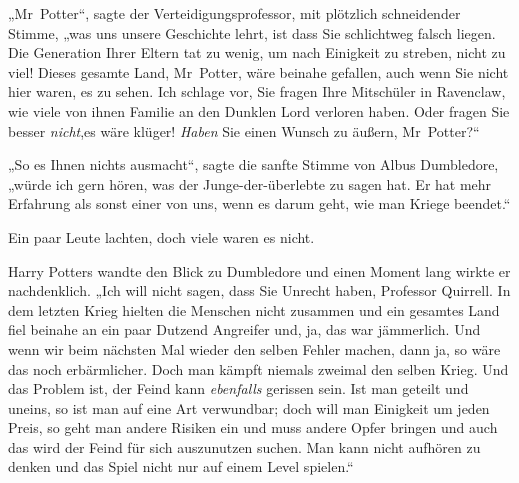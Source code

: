 „Mr~Potter“, sagte der Verteidigungsprofessor, mit plötzlich schneidender Stimme, „was uns unsere Geschichte lehrt, ist dass Sie schlichtweg falsch liegen. Die Generation Ihrer Eltern tat zu wenig, um nach Einigkeit zu streben, nicht zu viel! Dieses gesamte Land, Mr~Potter, wäre beinahe gefallen, auch wenn Sie nicht hier waren, es zu sehen. Ich schlage vor, Sie fragen Ihre Mitschüler in Ravenclaw, wie viele von ihnen Familie an den Dunklen Lord verloren haben. Oder fragen Sie besser \emph{nicht},es wäre klüger! \emph{Haben} Sie einen Wunsch zu äußern, Mr~Potter?“

„So es Ihnen nichts ausmacht“, sagte die sanfte Stimme von Albus Dumbledore, „würde ich gern hören, was der Junge-der-überlebte zu sagen hat. Er hat mehr Erfahrung als sonst einer von uns, wenn es darum geht, wie man Kriege beendet.“

Ein paar Leute lachten, doch viele waren es nicht.

Harry Potters wandte den Blick zu Dumbledore und einen Moment lang wirkte er nachdenklich. „Ich will nicht sagen, dass Sie Unrecht haben, Professor Quirrell. In dem letzten Krieg hielten die Menschen nicht zusammen und ein gesamtes Land fiel beinahe an ein paar Dutzend Angreifer und, ja, das war jämmerlich. Und wenn wir beim nächsten Mal wieder den selben Fehler machen, dann ja, so wäre das noch erbärmlicher. Doch man kämpft niemals zweimal den selben Krieg. Und das Problem ist, der Feind kann \emph{ebenfalls} gerissen sein. Ist man geteilt und uneins, so ist man auf eine Art verwundbar; doch will man Einigkeit um jeden Preis, so geht man andere Risiken ein und muss andere Opfer bringen und auch das wird der Feind für sich auszunutzen suchen. Man kann nicht aufhören zu denken und das Spiel nicht nur auf einem Level spielen.“

